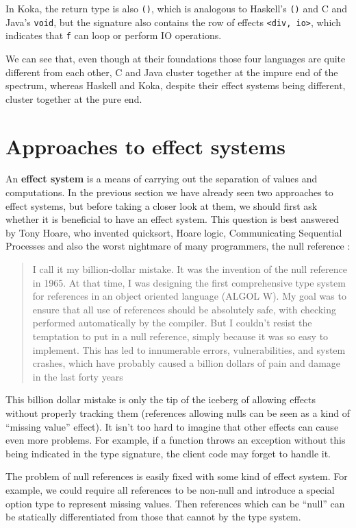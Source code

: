 \documentclass[declaration,inz,english,shortabstract]{iithesis}
\newcommand{\m}[1]{\texttt{#1}}
\begin{document}
In Koka, the return type is also \m{()}, which is analogous to Haskell's \m{()} and C and Java's \m{void}, but the signature also contains the row of effects \m{<div, io>}, which indicates that \m{f} can loop or perform IO operations.

We can see that, even though at their foundations those four languages are quite different from each other, C and Java cluster together at the impure end of the spectrum, whereas Haskell and Koka, despite their effect systems being different, cluster together at the pure end.

\section{Approaches to effect systems}

An \textbf{effect system} is a means of carrying out the separation of values and computations. In the previous section we have already seen two approaches to effect systems, but before taking a closer look at them, we should first ask whether it is beneficial to have an effect system. This question is best answered by Tony Hoare, who invented quicksort, Hoare logic, Communicating Sequential Processes and also the worst nightmare of many programmers, the null reference \cite{BillionDollarMistake}:

\begin{quote}
    I call it my billion-dollar mistake. It was the invention of the null reference in 1965. At that time, I was designing the first comprehensive type system for references in an object oriented language (ALGOL W). My goal was to ensure that all use of references should be absolutely safe, with checking performed automatically by the compiler. But I couldn't resist the temptation to put in a null reference, simply because it was so easy to implement. This has led to innumerable errors, vulnerabilities, and system crashes, which have probably caused a billion dollars of pain and damage in the last forty years
\end{quote}

This billion dollar mistake is only the tip of the iceberg of allowing effects without properly tracking them (references allowing nulls can be seen as a kind of ``missing value'' effect). It isn't too hard to imagine that other effects  can cause even more problems. For example, if a function throws an exception without this being indicated in the type signature, the client code may forget to handle it.

The problem of null references is easily fixed with some kind of effect system. For example, we could require all references to be non-null and introduce a special option type to represent missing values. Then references which can be ``null'' can be statically differentiated from those that cannot by the type system.
\end{document}
